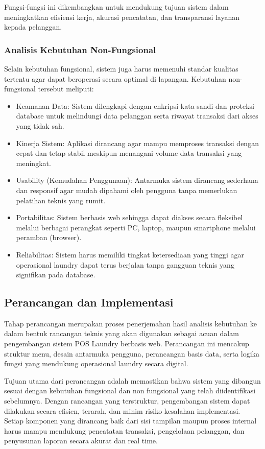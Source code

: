 Fungsi-fungsi ini dikembangkan untuk mendukung tujuan sistem dalam meningkatkan efisiensi kerja, akurasi pencatatan, dan transparansi layanan kepada pelanggan.

\subsubsection{Analisis Kebutuhan Non-Fungsional}
\indent
Selain kebutuhan fungsional, sistem juga harus memenuhi standar kualitas tertentu agar dapat beroperasi secara optimal di lapangan. Kebutuhan non-fungsional tersebut meliputi:

\begin{itemize}
    \item Keamanan Data: Sistem dilengkapi dengan enkripsi kata sandi dan proteksi database untuk melindungi data pelanggan serta riwayat transaksi dari akses yang tidak sah.
    \item Kinerja Sistem: Aplikasi dirancang agar mampu memproses transaksi dengan cepat dan tetap stabil meskipun menangani volume data transaksi yang meningkat.
    \item Usability (Kemudahan Penggunaan): Antarmuka sistem dirancang sederhana dan responsif agar mudah dipahami oleh pengguna tanpa memerlukan pelatihan teknis yang rumit.
    \item Portabilitas: Sistem berbasis web sehingga dapat diakses secara fleksibel melalui berbagai perangkat seperti PC, laptop, maupun smartphone melalui peramban (browser).
    \item Reliabilitas: Sistem harus memiliki tingkat ketersediaan yang tinggi agar operasional laundry dapat terus berjalan tanpa gangguan teknis yang signifikan pada database.
\end{itemize}


\subsection{Perancangan dan Implementasi}
\indent
Tahap perancangan merupakan proses penerjemahan hasil analisis kebutuhan ke dalam bentuk rancangan teknis yang akan digunakan sebagai acuan dalam pengembangan sistem POS Laundry berbasis web. Perancangan ini mencakup struktur menu, desain antarmuka pengguna, perancangan basis data, serta logika fungsi yang mendukung operasional laundry secara digital.

\indent
Tujuan utama dari perancangan adalah memastikan bahwa sistem yang dibangun sesuai dengan kebutuhan fungsional dan non fungsional yang telah diidentifikasi sebelumnya. Dengan rancangan yang terstruktur, pengembangan sistem dapat dilakukan secara efisien, terarah, dan minim risiko kesalahan implementasi. Setiap komponen yang dirancang baik dari sisi tampilan maupun proses internal harus mampu mendukung pencatatan transaksi, pengelolaan pelanggan, dan penyusunan laporan secara akurat dan real time.


